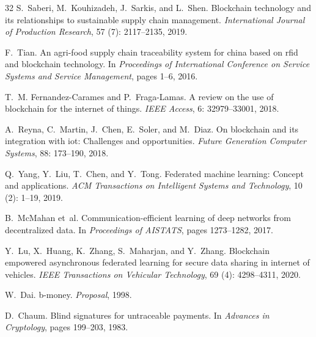 \documentclass[11pt]{article}
\begin{document}
\begin{thebibliography}{32}
S.~Saberi, M.~Kouhizadeh, J.~Sarkis, and L.~Shen.
\newblock Blockchain technology and its relationships to sustainable supply
  chain management.
\newblock \emph{International Journal of Production Research}, 57
  (7): 2117--2135, 2019.

F.~Tian.
\newblock An agri-food supply chain traceability system for china based on rfid
  and blockchain technology.
\newblock In \emph{Proceedings of International Conference on Service Systems
  and Service Management}, pages 1--6, 2016.

T.~M. Fernandez-Carames and P.~Fraga-Lamas.
\newblock A review on the use of blockchain for the internet of things.
\newblock \emph{IEEE Access}, 6: 32979--33001, 2018.

A.~Reyna, C.~Martin, J.~Chen, E.~Soler, and M.~Diaz.
\newblock On blockchain and its integration with iot: Challenges and
  opportunities.
\newblock \emph{Future Generation Computer Systems}, 88: 173--190,
  2018.

Q.~Yang, Y.~Liu, T.~Chen, and Y.~Tong.
\newblock Federated machine learning: Concept and applications.
\newblock \emph{ACM Transactions on Intelligent Systems and Technology},
  10 (2): 1--19, 2019.

B.~McMahan et~al.
\newblock Communication-efficient learning of deep networks from decentralized
  data.
\newblock In \emph{Proceedings of AISTATS}, pages 1273--1282, 2017.

Y.~Lu, X.~Huang, K.~Zhang, S.~Maharjan, and Y.~Zhang.
\newblock Blockchain empowered asynchronous federated learning for secure data
  sharing in internet of vehicles.
\newblock \emph{IEEE Transactions on Vehicular Technology}, 69
  (4): 4298--4311, 2020.

W.~Dai.
\newblock b-money.
\newblock \emph{Proposal}, 1998.

D.~Chaum.
\newblock Blind signatures for untraceable payments.
\newblock In \emph{Advances in Cryptology}, pages 199--203, 1983.


\end{thebibliography}
\end{document}
